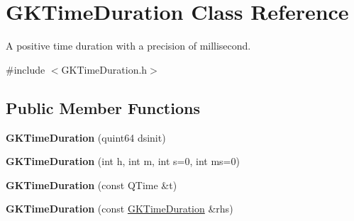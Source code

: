 \hypertarget{classGKTimeDuration}{}\section{G\+K\+Time\+Duration Class Reference}
\label{classGKTimeDuration}


A positive time duration with a precision of millisecond.  




{\ttfamily \#include $<$G\+K\+Time\+Duration.\+h$>$}

\subsection*{Public Member Functions}
\begin{DoxyCompactItemize}
\item 
{\bfseries G\+K\+Time\+Duration} (quint64 dsinit)\hypertarget{classGKTimeDuration_ac053c096f3666db57e364bf2b04bd4d9}{}\label{classGKTimeDuration_ac053c096f3666db57e364bf2b04bd4d9}

\item 
{\bfseries G\+K\+Time\+Duration} (int h, int m, int s=0, int ms=0)\hypertarget{classGKTimeDuration_a37253720e036484b0b317c25302bbb76}{}\label{classGKTimeDuration_a37253720e036484b0b317c25302bbb76}

\item 
{\bfseries G\+K\+Time\+Duration} (const Q\+Time \&t)\hypertarget{classGKTimeDuration_a4fef2ceb1797b3513ec2519e80ebc253}{}\label{classGKTimeDuration_a4fef2ceb1797b3513ec2519e80ebc253}

\item 
{\bfseries G\+K\+Time\+Duration} (const \hyperlink{classGKTimeDuration}{G\+K\+Time\+Duration} \&rhs)\hypertarget{classGKTimeDuration_aa2de538cbbaa011980332f49ac19d6e0}{}\label{classGKTimeDuration_aa2de538cbbaa011980332f49ac19d6e0}


\end{DoxyCompactItemize}
